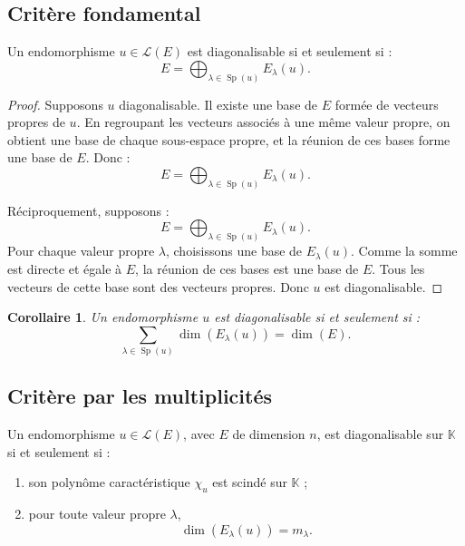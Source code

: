 \documentclass[11pt,a4paper]{article}
\newcommand{\K}{\mathbb K}
\newcommand{\Lcal}{\mathcal L}
\newcommand{\Sp}{\operatorname{Sp}}
\newtheorem{corollaire}[prop]{Corollaire}
\begin{document}
\subsection{Critère fondamental}

\begin{theorembox}
Un endomorphisme \(u\in\Lcal(E)\) est diagonalisable si et seulement si :
\[
E=\bigoplus_{\lambda\in\Sp(u)} E_\lambda(u).
\]
\end{theorembox}

\begin{proof}
Supposons \(u\) diagonalisable.  
Il existe une base de \(E\) formée de vecteurs propres de \(u\).  
En regroupant les vecteurs associés à une même valeur propre, on obtient une base de chaque sous-espace propre, et la réunion de ces bases forme une base de \(E\).  
Donc :
\[
E=\bigoplus_{\lambda\in\Sp(u)}E_\lambda(u).
\]

Réciproquement, supposons :
\[
E=\bigoplus_{\lambda\in\Sp(u)}E_\lambda(u).
\]
Pour chaque valeur propre \(\lambda\), choisissons une base de \(E_\lambda(u)\).  
Comme la somme est directe et égale à \(E\), la réunion de ces bases est une base de \(E\).  
Tous les vecteurs de cette base sont des vecteurs propres.  
Donc \(u\) est diagonalisable.
\end{proof}

\begin{corollaire}
Un endomorphisme \(u\) est diagonalisable si et seulement si :
\[
\sum_{\lambda\in\Sp(u)}\dim(E_\lambda(u))=\dim(E).
\]
\end{corollaire}

\subsection{Critère par les multiplicités}

\begin{theorembox}
Un endomorphisme \(u\in\Lcal(E)\), avec \(E\) de dimension \(n\), est diagonalisable sur \(\K\) si et seulement si :
\begin{enumerate}
    \item son polynôme caractéristique \(\chi_u\) est scindé sur \(\K\) ;
    \item pour toute valeur propre \(\lambda\),
    \[
    \dim(E_\lambda(u))=m_\lambda.
    \]
\end{enumerate}
\end{theorembox}
\end{document}
